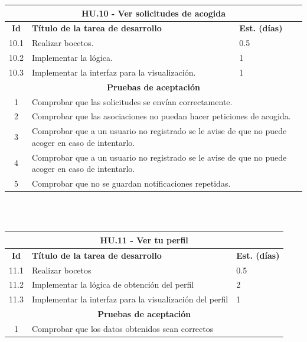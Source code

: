 \begin{tabular}{|c|p{9.5cm}|p{1cm}|}
	\hline
	\multicolumn{3}{|c|}{\textbf{HU.10 - Ver solicitudes de acogida}} \\
	\hline
	\textbf{Id} & \textbf{Título de la tarea de desarrollo} & \textbf{Est. (días)} \\
	\hline
	10.1 & Realizar bocetos. & 0.5 \\ \hline
	10.2 &  Implementar la lógica. & 1 \\ \hline
	10.3 &  Implementar la interfaz para la visualización. & 1 \\ \hline
	\multicolumn{3}{|c|}{\textbf{Pruebas de aceptación}} \\ \hline
	1 & \multicolumn{2}{|p{10cm}|}{Comprobar que las solicitudes se envían correctamente.} \\ \hline
	2 & \multicolumn{2}{|p{10cm}|}{Comprobar que las asociaciones no puedan hacer peticiones de acogida.} \\ \hline
	3 & \multicolumn{2}{|p{10cm}|}{Comprobar que a un usuario no registrado se le avise de que no puede acoger en caso de intentarlo.} \\ \hline
	4 & \multicolumn{2}{|p{10cm}|}{Comprobar que a un usuario no registrado se le avise de que no puede acoger en caso de intentarlo.} \\ \hline
	5 & \multicolumn{2}{|p{10cm}|}{Comprobar que no se guardan notificaciones repetidas.} \\ \hline
	
\end{tabular} \\ \\

\begin{tabular}{|c|p{9.5cm}|p{1cm}|}
	\hline
	\multicolumn{3}{|c|}{\textbf{HU.11 - Ver tu perfil}} \\
	\hline
	\textbf{Id} & \textbf{Título de la tarea de desarrollo} & \textbf{Est. (días)} \\
	\hline
	11.1 & Realizar bocetos & 0.5 \\ \hline
	11.2 &  Implementar la lógica de obtención del perfil & 2 \\ \hline
	11.3 &  Implementar la interfaz para la visualización del perfil & 1 \\ \hline
	\multicolumn{3}{|c|}{\textbf{Pruebas de aceptación}} \\ \hline
	1 & \multicolumn{2}{|p{10cm}|}{Comprobar que los datos obtenidos sean correctos} \\ \hline
	
\end{tabular} \\ \\

